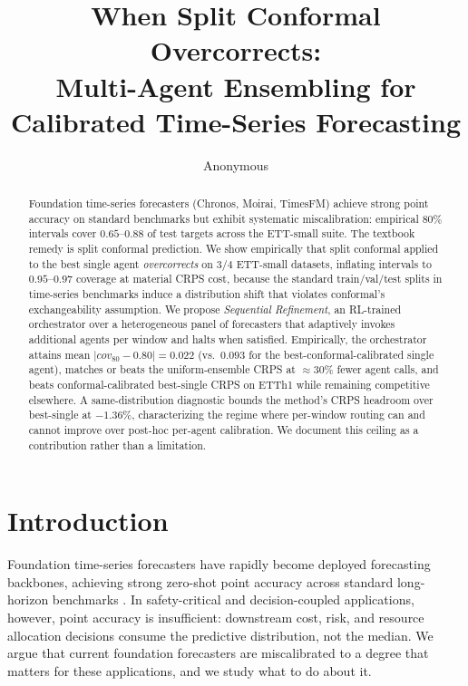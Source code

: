 \documentclass{article}
\title{When Split Conformal Overcorrects:\\
       Multi-Agent Ensembling for Calibrated Time-Series Forecasting}
\author{Anonymous}
\date{}
\begin{document}
\maketitle

\begin{abstract}
Foundation time-series forecasters (Chronos, Moirai, TimesFM) achieve strong
point accuracy on standard benchmarks but exhibit systematic miscalibration:
empirical $80\%$ intervals cover $0.65$--$0.88$ of test targets across the
ETT-small suite. The textbook remedy is split conformal prediction. We show
empirically that split conformal applied to the best single agent
\emph{overcorrects} on $3/4$ ETT-small datasets, inflating intervals to
$0.95$--$0.97$ coverage at material CRPS cost, because the standard
train/val/test splits in time-series benchmarks induce a distribution shift
that violates conformal's exchangeability assumption. We propose
\emph{Sequential Refinement}, an RL-trained orchestrator over a heterogeneous
panel of forecasters that adaptively invokes additional agents per window
and halts when satisfied. Empirically, the orchestrator attains mean
$|cov_{80} - 0.80| = 0.022$ (vs.\ $0.093$ for the best-conformal-calibrated
single agent), matches or beats the uniform-ensemble CRPS at $\approx 30\%$
fewer agent calls, and beats conformal-calibrated best-single CRPS on
ETTh1 while remaining competitive elsewhere. A same-distribution diagnostic
bounds the method's CRPS headroom over best-single at $-1.36\%$, characterizing
the regime where per-window routing can and cannot improve over post-hoc
per-agent calibration. We document this ceiling as a contribution rather
than a limitation.
\end{abstract}

\section{Introduction}
\label{sec:intro}

Foundation time-series forecasters
\cite{ansari2024chronos,liu2024moirai,das2024timesfm}
have rapidly become deployed forecasting backbones, achieving strong zero-shot
point accuracy across standard long-horizon benchmarks
\cite{nie2023patchtst,liu2024itransformer}. In safety-critical and decision-coupled
applications, however, point accuracy is insufficient: downstream cost,
risk, and resource allocation decisions consume the predictive
distribution, not the median. We argue that current foundation forecasters
are miscalibrated to a degree that matters for these applications, and we
study what to do about it.
\end{document}
